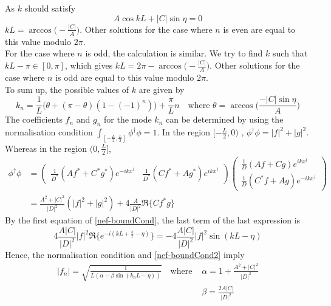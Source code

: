As $k$ should satisfy  
\begin{equation}
A \cos kL + |C| \sin\eta= 0
\end{equation}
$kL = \arccos \big(-\frac{|C|}{A}\big)$.
Other solutions for the case where $n$ is even are equal to this value modulo $2 \pi$. \\
For the case where $n$ is odd, the calculation is similar.
We try to find $k$ such that $kL - \pi \in [0, \pi]$, which gives $kL = 2\pi - \arccos \big(-\frac{|C|}{A}\big)$. 
Other solutions for the case where $n$ is odd are equal to this value modulo $2 \pi$.\\
To sum up, the possible values of $k$ are given by
\begin{equation}
k_{n} = \frac{1}{L} \big(\theta + (\pi - \theta)(1- (-1)^n)\big) + \frac{\pi}{L}n 
\quad \textrm{where $\theta = \arccos\bigg( \frac{-|C| \sin \eta}{A} \bigg)$}
\end{equation}
The coefficients $f_{n}$ and $g_{n}$ for the mode $k_{ n}$ can be determined by using the normalisation condition  $\int_{[-\frac{L}{2}, \frac{L}{2}]}\phi^\dagger \phi = 1$. 
In the region $[-\frac{L}{2}, 0)$ , $\phi^\dagger \phi = | f |^2 + | g |^2$. Whereas in the region $(0, \frac{L}{2}]$, 
\begin{equation}\label{nef-norm1}
\begin{split}
\phi^\dagger \phi & = \begin{pmatrix}
\frac{1}{D^*}(Af^* +  C^*g^*)e^{-ikx^1}  & \frac{1}{D^*}(C f^* + Ag^*)e^{ikx^1} 
\end{pmatrix}\begin{pmatrix}
\frac{1}{D}(Af +  Cg)e^{ikx^1}  \\
 \frac{1}{D}(C^* f + Ag)e^{-ikx^1} 
\end{pmatrix}  \\
 & =
\frac{A^2 + | C|^2}{| D |^2}(|f|^2 + |g|^2) + 4\frac{A}{|D|^2}\Re \{C f^* g\}
\end{split}
\end{equation}
By the first equation of \cref{nef-boundCond}, the last term of the last expression is 
\begin{equation*}
4\frac{A |C|}{|D|^2}| f|^2\Re\{e ^{-i(kL + \frac{\pi}{2} - \eta)}\} = 
- 4\frac{A |C|}{|D|^2}| f|^2\sin( kL - \eta) 
\end{equation*}
Hence, the normalisation condition and \cref{nef-boundCond2} imply
\begin{equation}
\begin{split}
 | f_{n} | =  \sqrt{\frac{1}{L(\alpha - \beta \sin (k_{n} L - \eta))}}  \quad  \textrm{where } & \textrm{$\alpha = 1+\frac{A^2 + |C|^2}{|D|^2}$} \\ 
 & \textrm{$\beta = \frac{2 A |C|}{|D|^2}$}
\end{split}
\end{equation}
